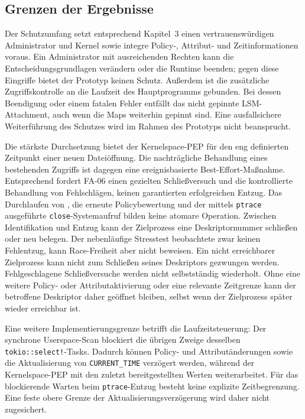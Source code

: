 \subsection{Grenzen der Ergebnisse}

Der Schutzumfang setzt entsprechend Kapitel~3 einen vertrauenswürdigen Administrator und Kernel sowie integre Policy-, Attribut- und Zeitinformationen voraus. Ein Administrator mit ausreichenden Rechten kann die Entscheidungsgrundlagen verändern oder die Runtime beenden; gegen diese Eingriffe bietet der Prototyp keinen Schutz. Außerdem ist die zusätzliche Zugriffskontrolle an die Laufzeit des Hauptprogramms gebunden. Bei dessen Beendigung oder einem fatalen Fehler entfällt das nicht gepinnte LSM-Attachment, auch wenn die Maps weiterhin gepinnt sind. Eine ausfallsichere Weiterführung des Schutzes wird im Rahmen des Prototyps nicht beansprucht.

Die stärkste Durchsetzung bietet der Kernelspace-PEP für den eng definierten Zeitpunkt einer neuen Dateiöffnung. Die nachträgliche Behandlung eines bestehenden Zugriffs ist dagegen eine ereignisbasierte Best-Effort-Maßnahme. Entsprechend fordert \mbox{FA-06} einen gezielten Schließversuch und die kontrollierte Behandlung von Fehlschlägen, keinen garantierten erfolgreichen Entzug. Das Durchlaufen von , die erneute Policybewertung und der mittels \texttt{ptrace} ausgeführte \texttt{close}-Systemaufruf bilden keine atomare Operation. Zwischen Identifikation und Entzug kann der Zielprozess eine Deskriptornummer schließen oder neu belegen. Der nebenläufige Stresstest beobachtete zwar keinen Fehlentzug, kann Race-Freiheit aber nicht beweisen. Ein nicht erreichbarer Zielprozess kann nicht zum Schließen seines Deskriptors gezwungen werden. Fehlgeschlagene Schließversuche werden nicht selbstständig wiederholt. Ohne eine weitere Policy- oder Attributaktivierung oder eine relevante Zeitgrenze kann der betroffene Deskriptor daher geöffnet bleiben, selbst wenn der Zielprozess später wieder erreichbar ist.

Eine weitere Implementierungsgrenze betrifft die Laufzeitsteuerung: Der synchrone Userspace-Scan blockiert die übrigen Zweige desselben \texttt{tokio::select!}-Tasks. Dadurch können Policy- und Attributänderungen sowie die Aktualisierung von \texttt{CURRENT\_TIME} verzögert werden, während der Kernelspace-PEP mit den zuletzt bereitgestellten Werten weiterarbeitet. Für das blockierende Warten beim \texttt{ptrace}-Entzug besteht keine explizite Zeitbegrenzung. Eine feste obere Grenze der Aktualisierungsverzögerung wird daher nicht zugesichert.

